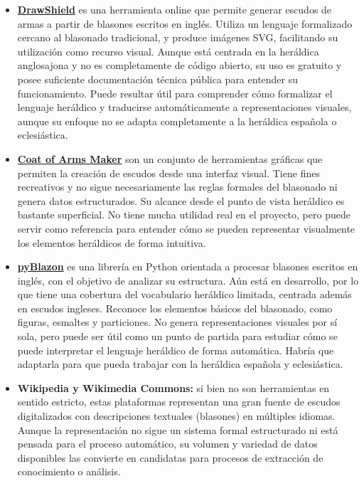 \begin{itemize}
    \item \textbf{\href{https://drawshield.net/index.html}{DrawShield}} es una herramienta online que permite generar escudos de armas
    a partir de blasones escritos en inglés. Utiliza un lenguaje formalizado cercano al blasonado
    tradicional, y produce imágenes SVG, facilitando su utilización como recurso visual. Aunque está 
    centrada en la heráldica anglosajona y no es completamente de código abierto, su 
    uso es gratuito y posee suficiente documentación técnica pública para entender su 
    funcionamiento. Puede resultar útil para comprender cómo formalizar el lenguaje heráldico
    y traducirse automáticamente a representaciones visuales, aunque su enfoque no se adapta
    completamente a la heráldica española o eclesiástica.
    \item \textbf{\href{https://coamaker.com/}{Coat of Arms Maker}} son un conjunto de herramientas gráficas que permiten
    la creación de escudos desde una interfaz visual. Tiene fines recreativos y no sigue
    necesariamente las reglas formales del blasonado ni genera datos estructurados. Su alcance
    desde el punto de vista heráldico es bastante superficial. No tiene mucha utilidad real
    en el proyecto, pero puede servir como referencia para entender cómo se pueden representar
    visualmente los elementos heráldicos de forma intuitiva.
    \item \textbf{\href{https://web.meson.org/pyBlazon/}{pyBlazon}} es una librería en Python orientada a procesar blasones escritos en
    inglés, con el objetivo de analizar su estructura. Aún está en desarrollo, por lo que tiene
    una cobertura del vocabulario heráldico limitada, centrada además en escudos ingleses.
    Reconoce los elementos básicos del blasonado, como figuras, esmaltes y particiones.
    No genera representaciones visuales por sí sola, pero puede ser útil como un punto de partida
    para estudiar cómo se puede interpretar el lenguaje heráldico de forma automática. Habría que
    adaptarla para que pueda trabajar con la heráldica española y eclesiástica.
    \item \textbf{Wikipedia y Wikimedia Commons:} si bien no son herramientas en sentido estricto,
    estas plataformas representan una gran fuente de escudos digitalizados con descripciones
    textuales (blasones) en múltiples idiomas. Aunque la representación no sigue un sistema formal 
    estructurado ni está pensada para el proceso automático, su volumen y variedad de datos
    disponibles las convierte en candidatas para procesos de extracción de conocimiento o análisis.
\end{itemize}

